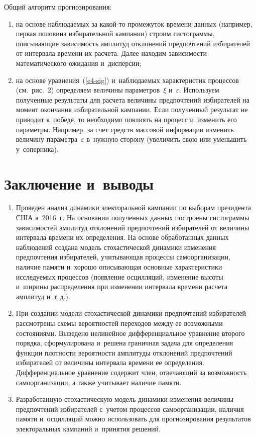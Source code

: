 \begin{multicols}{2}
    Общий алгоритм прогнозирования: 
    \begin{enumerate}[(1)]
    \item на основе наблюдаемых за какой-то промежуток времени данных 
(например, первая половина избирательной кампании) строим гистограммы, 
описывающие зависимость амплитуд отклонений предпочтений избирателей от 
интервала времени их расчета. Далее находим зависимости математического 
ожидания и~дисперсии; 
    \item  на основе уравнения~(\ref{e4-sig}) и~наблюдаемых характеристик 
процессов (см.\ рис.~2) определяем величины параметров~$\xi$ и~$\varepsilon$. 
Используем полученные результаты для расчета величины предпочтений 
избирателей на момент окончания избирательной кампании. Если полученный 
результат не приводит к~победе, то необходимо повлиять на процесс 
и~изменить его параметры. Например, за счет средств массовой информации 
изменить величину параметра~$\varepsilon$ в~нужную сторону (увеличить свою 
или уменьшить у~соперника). 
    \end{enumerate}
    
    \vspace*{-11pt}

\section{Заключение и~выводы }

\vspace*{-3pt}

\noindent
\begin{enumerate}[1.]
    \item Проведен анализ динамики электоральной кампании по выборам 
президента США в~2016~г. На основании полученных данных построены 
гистограммы зависимостей амплитуд отклонений предпочтений избирателей от 
величины интервала времени их определения. На основе обработанных 
данных наблюдений создана модель стохастической динамики изменения 
предпочтения избирателей, учитывающая процессы самоорганизации, 
наличие памяти и~хорошо описывающая основные характеристики 
исследуемых процессов (появление осцилляций, изменение высоты и~ширины 
распределения при изменении интервала времени расчета амплитуд и~т.\,д.). 



    \item При создании модели стохастической динамики предпочтений 
избирателей рассмотрены схемы вероятностей переходов между ее 
возможными состояниями. Выведено нелинейное дифференциальное 
уравнение второго порядка, сформулирована и~решена граничная задача для 
определения функции плотности вероятности амплитуды отклонений 
предпочтений избирателей от величины интервала времени ее определения. 
Дифференциальное уравнение содержит член, отвечающий за возможность 
самоорганизации, а также учитывает наличие памяти. 
    \item Разработанную стохастическую модель динамики изменения 
величины предпочтений избирателей с~учетом процессов самоорганизации, 
наличия памяти и~осцилляций можно использовать для прогнозирования 
результатов электоральных кампаний и~принятия решений. 
    \end{enumerate}
   

\end{multicols}
